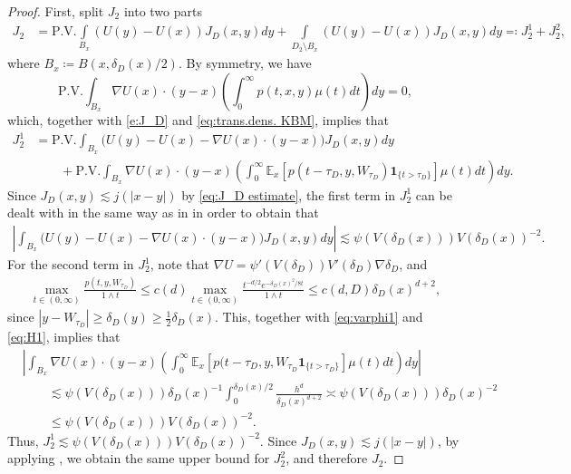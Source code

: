 \documentclass[12pt,a4paper,onecolumn]{amsart}
\theoremstyle{definition}
\newcommand{\ex}{\mathbb{E}}
\newcommand{\1}{\mathbf 1}
\newcommand{\de}{\delta_D}
\numberwithin{equation}{section}
\begin{document}
\begin{proof}
First, split $J_2$ into two parts
\begin{align*}
    J_2&=\textrm{P.V.}\int\limits_{B_x}(U(y)-U(x))J_D(x,y) dy+\!\!\int\limits_{D_2\setminus B_x}(U(y)-U(x))J_D(x,y) dy\eqqcolon J^1_2+J^2_2,
\end{align*}
where $B_x\coloneqq B(x,\de(x)/2)$. By symmetry, we have
$$\textrm{P.V.}\int_{B_x}\nabla U(x)\cdot(y-x)\left(\int_0^\infty p(t,x,y)\mu(t)dt\right)dy=0,$$
which, together with \eqref{e:J_D} and \eqref{eq:trans.dens. KBM}, implies that
\begin{align*}
    J^1_2&=\textrm{P.V.}\int_{B_x}\big(U(y)-U(x)-\nabla U(x)\cdot(y-x)\big)J_D(x,y) dy\\
    &\qquad +\textrm{P.V.}\int_{B_x}\nabla U(x)\cdot(y-x)\left(\int_0^\infty \ex_x[p(t-\tau_D,y,W_{\tau_D})\1_{\{t>\tau_D\}}]\mu(t)dt\right) dy.
\end{align*}
Since $J_D(x,y)\lesssim j(|x-y|)$ by \eqref{eq:J_D estimate}, the first term in $J^1_2$ can be dealt with in the same way as in \cite{semilinear_cvw} in order to obtain that
\begin{align*}
    \left|\int_{B_x}\big(U(y)-U(x)-\nabla U(x)\cdot(y-x)\big)J_D(x,y) dy\right|\lesssim \psi(V(\de(x)))V(\de(x))^{-2}.
\end{align*}
For the second term in $J^1_2$, note that $\nabla U=\psi'(V(\de))V'(\de)\nabla \de$, and
\begin{align*}
    \max_{t\in (0,\infty)}\frac{p(t,y,W_{\tau_D})}{1\wedge t}\le c(d)\max_{t\in (0,\infty)}\frac{t^{-d/2}e^{-\de(x)^2/8t}}{1\wedge t}\le c(d,D) \de(x)^{d+2},    
\end{align*}
since $|y-W_{\tau_D}|\ge\de(y)\ge \frac12 \de(x)$. This, together with \eqref{eq:varphi1} and \eqref{eq:H1}, implies that
\begin{align*}
    &\left|\int_{B_x}\nabla U(x)\cdot(y-x)\left(\int_0^\infty \ex_x[p(t-\tau_D,y,W_{\tau_D}\1_{\{t>\tau_D\}}]\mu(t)dt\right) dy\right|\\
    &\qquad\lesssim \psi(V(\de(x)))\de(x)^{-1}\int_0^{\de(x)/2}\frac{h^d}{\de(x)^{d+2}}\asymp \psi(V(\de(x)))\de(x)^{-2}\\
    &\qquad\le \psi(V(\de(x)))V(\de(x))^{-2}.
\end{align*}
Thus, $J^1_2\lesssim \psi(V(\de(x)))V(\de(x))^{-2}$. Since $J_D(x,y)\lesssim j(|x-y|)$, by applying \cite[Eq. (3.6)]{semilinear_cvw}, we obtain the same upper bound for $J^2_2$, and therefore $J_2$. 



\end{proof}
\end{document}
